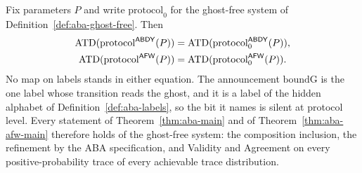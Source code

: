 \begin{theorem}
  \label{thm:aba-ghost-removal}
  \leanok
  Fix parameters $P$ and write $\mathrm{protocol}_0$ for the ghost-free system of Definition~\ref{def:aba-ghost-free}.
  Then
  \[ \begin{aligned}
       \operatorname{ATD}(\mathrm{protocol}^{\mathsf{ABDY}}(P)) &= \operatorname{ATD}(\mathrm{protocol}_0^{\mathsf{ABDY}}(P)),\\
       \operatorname{ATD}(\mathrm{protocol}^{\mathsf{AFW}}(P)) &= \operatorname{ATD}(\mathrm{protocol}_0^{\mathsf{AFW}}(P)).
     \end{aligned} \]
  No map on labels stands in either equation.
  The announcement $\mathrm{boundG}$ is the one label whose transition reads the ghost, and it is a label of the hidden alphabet of Definition~\ref{def:aba-labels}, so the bit it names is silent at protocol level.
  Every statement of Theorem~\ref{thm:aba-main} and of Theorem~\ref{thm:aba-afw-main} therefore holds of the ghost-free system: the composition inclusion, the refinement by the ABA specification, and Validity and Agreement on every positive-probability trace of every achievable trace distribution.
\end{theorem}

